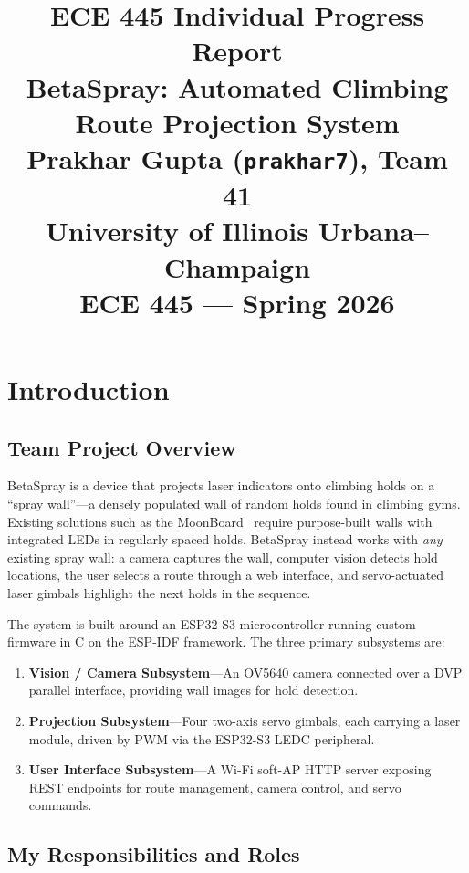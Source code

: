 \documentclass[12pt]{article}
\title{
  \textbf{ECE 445 Individual Progress Report} \\
  \large BetaSpray: Automated Climbing Route Projection System \\[0.5em]
  \normalsize Prakhar Gupta (\texttt{prakhar7}), Team 41 \\
  University of Illinois Urbana--Champaign \\
  ECE 445 --- Spring 2026
}
\date{}
\begin{document}
\maketitle
\thispagestyle{fancy}


\section{Introduction}

\subsection{Team Project Overview}

BetaSpray is a device that projects laser indicators onto climbing holds on a
``spray wall''---a densely populated wall of random holds found in climbing
gyms.  Existing solutions such as the MoonBoard~\cite{moonboard} require
purpose-built walls with integrated LEDs in regularly spaced holds.  BetaSpray
instead works with \emph{any} existing spray wall: a camera captures the wall,
computer vision detects hold locations, the user selects a route through a web
interface, and servo-actuated laser gimbals highlight the next holds in the
sequence.

The system is built around an ESP32-S3 microcontroller running custom firmware
in C on the ESP-IDF framework.  The three primary subsystems are:

\begin{enumerate}
  \item \textbf{Vision / Camera Subsystem}---An OV5640 camera connected over
        a DVP parallel interface, providing wall images for hold detection.
  \item \textbf{Projection Subsystem}---Four two-axis servo gimbals, each
        carrying a laser module, driven by PWM via the ESP32-S3 LEDC peripheral.
  \item \textbf{User Interface Subsystem}---A Wi-Fi soft-AP HTTP server
        exposing REST endpoints for route management, camera control, and servo
        commands.
\end{enumerate}

\subsection{My Responsibilities and Roles}
\end{document}

